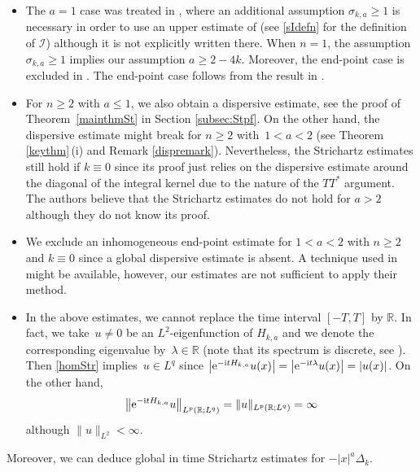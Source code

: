 \documentclass[pdftex]{sigma}
\numberwithin{equation}{section}
\def\R{\mathbb{R}}%
\def\l{\lambda}
\def\s{\sigma}
\newcommand{\sI}{\mathscr{I}}
\begin{document}
\begin{Remark}\label{rem:mainthmrem}\quad
\begin{itemize}\itemsep=0pt
\item[(1)]
The $a=1$ case was treated in \cite{B}, where an additional assumption $\s_{k,a}\ge 1$ is necessary in order to use an upper estimate of \smash{$\sI\bigl(2,\frac{\s_{k,a}-1}{2};w;t\bigr)$} \cite[Proposition 4.26]{BKO} (see \eqref{sIdefn} for the definition of $\sI$) although it is not explicitly written there. When $n=1$, the assumption~${\s_{k,a}\ge 1}$ implies our assumption $a\ge 2-4k$. Moreover, the end-point case \smash{$\bigl(2,\frac{2\s_{k,a}}{\s_{k,a}-1}\bigr)$} is excluded in \cite{B}.
The end-point case follows from the result in \cite{KT}.

\item[(2)] For $n\geq 2$ with $a\leq 1$, we also obtain a dispersive estimate, see the proof of Theorem~\ref{mainthmSt} in Section \ref{subsec:Stpf}. On the other hand, the dispersive estimate might break for $n\geq 2$ with~${1<a<2}$ (see Theorem \ref{keythm}\,(i) and Remark \ref{dispremark}). Nevertheless, the Strichartz estimates still hold if $k\equiv 0$ since its proof just relies on the dispersive estimate around the diagonal of the integral kernel due to the nature of the $TT^*$ argument. The authors believe that the Strichartz estimates do not hold for $a>2$ although they do not know its proof.


\item[(3)] We exclude an inhomogeneous end-point estimate for $1<a<2$ with $n\geq 2$ and $k\equiv 0$ since a global dispersive estimate is absent. A technique used in \cite{HZ,ZZ} might be available, however, our estimates are not sufficient to apply their method.

\item[(4)] In the above estimates, we cannot replace the time interval $[-T,T]$ by $\R$. In fact, we take~${u\neq 0}$ be an $L^2$-eigenfunction of $H_{k,a}$ and we denote the corresponding eigenvalue by~${\l\in \R}$ (note that its spectrum is discrete, see \cite[Corollary 3.22]{BKO}). Then \eqref{homStr} implies~${u\in L^q}$ since $\big|{\rm e}^{-{\rm i}tH_{k,a}}u(x)\big|=\big|{\rm e}^{-{\rm i}t\l}u(x)\big|=|u(x)|$. On the other hand,
 \[
 \big\|{\rm e}^{-{\rm i}tH_{k,a}}u\big\|_{L^{p}(\R;L^q)}=\|u\|_{L^{p}(\R;L^q)}=\infty\] although $\|u\|_{L^2}<\infty$.
\end{itemize}
\end{Remark}

Moreover, we can deduce global in time Strichartz estimates for $-|x|^a\Delta_{k}$.
\end{document}
